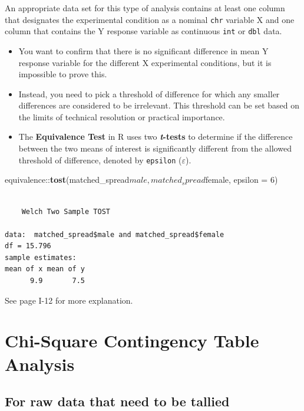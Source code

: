 \documentclass[twoside, 12pt]{article}
\newenvironment{Shaded}{\begin{snugshade}}{\end{snugshade}}
\newcommand{\KeywordTok}[1]{\textcolor[rgb]{0.13,0.29,0.53}{\textbf{{#1}}}}
\newcommand{\DataTypeTok}[1]{\textcolor[rgb]{0.13,0.29,0.53}{{#1}}}
\newcommand{\DecValTok}[1]{\textcolor[rgb]{0.00,0.00,0.81}{{#1}}}
\newcommand{\NormalTok}[1]{{#1}}
\begin{document}
An appropriate data set for this type of analysis contains at least one
column that designates the experimental condition as a nominal
\texttt{chr} variable X and one column that contains the Y response
variable as continuous \texttt{int} or \texttt{dbl} data.

\begin{itemize}
\item
  You want to confirm that there is no significant difference in mean Y
  response variable for the different X experimental conditions, but it
  is impossible to prove this.
\item
  Instead, you need to pick a threshold of difference for which any
  smaller differences are considered to be irrelevant. This threshold
  can be set based on the limits of technical resolution or practical
  importance.
\item
  The \textbf{Equivalence Test} in R uses two \textbf{\emph{t}-tests} to
  determine if the difference between the two means of interest is
  significantly different from the allowed threshold of difference,
  denoted by \texttt{epsilon} (\(\varepsilon\)).
\end{itemize}

\begin{Shaded}
\begin{Highlighting}[]
\NormalTok{equivalence::}\KeywordTok{tost}\NormalTok{(matched_spread$male, matched_spread$female, }
                  \DataTypeTok{epsilon =} \DecValTok{6}\NormalTok{)}
\end{Highlighting}
\end{Shaded}

\begin{Verbatim}[frame=single]

    Welch Two Sample TOST

data:  matched_spread$male and matched_spread$female
df = 15.796
sample estimates:
mean of x mean of y 
      9.9       7.5 
\end{Verbatim}

See page I-12 for more explanation.

\section{Chi-Square Contingency Table
Analysis}\label{chi-square-contingency-table-analysis}

\subsection*{For raw data that need to be
tallied}\label{for-raw-data-that-need-to-be-tallied}
\end{document}
